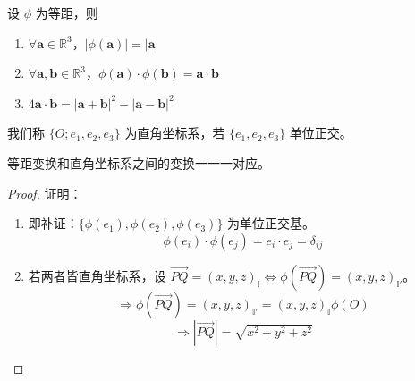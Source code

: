 \documentclass[lang=cn,10pt,thmcnt=section]{elegantbook}
\renewcommand{\vec}[1]{\mathbf{#1}}
\begin{document}
        \begin{proposition}
        设 $\phi$ 为等距，则
        \begin{enumerate}
            \item $\forall \vec{a} \in \mathbb{R}^3$，$|\phi(\vec{a})| = |\vec{a}|$
            \item $\forall \vec{a}, \vec{b} \in \mathbb{R}^3$，$\phi(\vec{a}) \cdot \phi(\vec{b}) = \vec{a} \cdot \vec{b}$
            \item $4 \vec{a} \cdot \vec{b} = |\vec{a} + \vec{b}|^2 - |\vec{a} - \vec{b}|^2$
        \end{enumerate}
        \end{proposition}
    
        \begin{definition}[直角坐标系]
            我们称 $\{O; e_1, e_2, e_3\}$ 为直角坐标系，若 $\{e_1, e_2, e_3\}$ 单位正交。
            \end{definition}
            
            \begin{definition}[等距变换]
            等距变换和直角坐标系之间的变换一一一对应。
            \end{definition}
            
            \begin{proof}
            证明：
            \begin{enumerate}
                \item 即补证：$\{\phi(e_1), \phi(e_2), \phi(e_3)\}$ 为单位正交基。
                \begin{equation*}
                \phi(e_i) \cdot \phi(e_j) = e_i \cdot e_j = \delta_{ij}
                \end{equation*}
                \item 若两者皆直角坐标系，设 $\overrightarrow{PQ} = (x, y, z)_{\mathbb{I}} \Leftrightarrow \phi(\overrightarrow{PQ}) = (x, y, z)_{\mathbb{I}'}$。
                \begin{equation*}
                \Rightarrow \phi(\overrightarrow{PQ}) = (x, y, z)_{\mathbb{I}'} = (x, y, z)_{\mathbb{I}} \phi(O)
                \end{equation*}
                \begin{equation*}
                \Rightarrow |\overrightarrow{PQ}| = \sqrt{x^2 + y^2 + z^2}
                \end{equation*}
            \end{enumerate}
            \end{proof}
            
\end{document}

